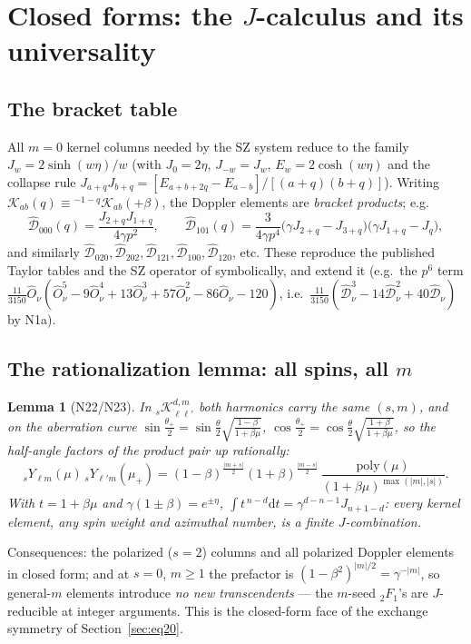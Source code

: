 \documentclass[useAMS,usenatbib]{article}
\newcommand{\Oh}{\hat{O}_\nu}
\newcommand{\Dv}{\hat{\mathcal{D}}_\nu}
\newcommand{\Kk}{\mathcal{K}}
\newcommand{\Do}{\hat{\mathcal{D}}}
\newcommand{\dd}{\mathrm{d}}
\newtheorem{lemma}{Lemma}
\begin{document}
\section{Closed forms: the $J$-calculus and its universality}\label{sec:closed}

\subsection{The bracket table}
All $m=0$ kernel columns needed by the SZ system reduce to the family $J_w = 2\sinh(w\eta)/w$ (with
$J_0 = 2\eta$, $J_{-w} = J_w$, $E_w = 2\cosh(w\eta)$ and the collapse rule
$J_{a+q}J_{b+q} = [E_{a+b+2q}-E_{a-b}]/[(a+q)(b+q)]$). Writing
$\Kk_{ab}(q) \equiv {}^{-1-q}\Kk_{ab}(+\beta)$, the Doppler elements are \emph{bracket products}; e.g.
\begin{equation}
  \Do_{000}(q) = \frac{J_{2+q}J_{1+q}}{4\gamma p^2},\qquad
  \Do_{101}(q) = \frac{3}{4\gamma p^4}\big(\gamma J_{2+q}-J_{3+q}\big)\big(\gamma J_{1+q}-J_{q}\big),
\end{equation}
and similarly $\Do_{020}, \Do_{202}, \Do_{121}, \Do_{100}, \Do_{120}$, etc. These reproduce the published
Taylor tables and the SZ operator of \citet[Eq.~11]{CR26} symbolically, and extend it (e.g.\ the $p^6$ term
$\tfrac{11}{3150}\Oh(\Oh^5-9\Oh^4+13\Oh^3+57\Oh^2-86\Oh-120)$, i.e.\
$\tfrac{11}{3150}(\Dv^3 - 14\Dv^2 + 40\Dv)$ by N1a).

\subsection{The rationalization lemma: all spins, all $m$}
\begin{lemma}[N22/N23]
In ${}_s\Kk^{d,m}_{\ell\ell'}$ both harmonics carry the same $(s,m)$, and on the aberration curve
$\sin\tfrac{\theta_+}{2} = \sin\tfrac\theta2\sqrt{\tfrac{1-\beta}{1+\beta\mu}}$,
$\cos\tfrac{\theta_+}{2} = \cos\tfrac\theta2\sqrt{\tfrac{1+\beta}{1+\beta\mu}}$, so the half-angle factors of the
product pair up rationally:
\begin{equation}
  {}_sY_{\ell m}(\mu)\,{}_sY_{\ell'm}(\mu_+)
  = (1-\beta)^{\frac{|m+s|}2}(1+\beta)^{\frac{|m-s|}2}\,
    \frac{\mathrm{poly}(\mu)}{(1+\beta\mu)^{\max(|m|,|s|)}}.
\end{equation}
With $t = 1+\beta\mu$ and $\gamma(1\pm\beta) = e^{\pm\eta}$, $\int t^{\,n-d}\dd t = \gamma^{d-n-1}J_{n+1-d}$:
\emph{every} kernel element, any spin weight and azimuthal number, is a finite $J$-combination.
\end{lemma}
Consequences: the polarized ($s=2$) columns and all polarized Doppler elements in closed form; and at $s=0$,
$m\ge1$ the prefactor is $(1-\beta^2)^{|m|/2} = \gamma^{-|m|}$, so general-$m$ elements introduce \emph{no new
transcendents} --- the $m$-seed ${}_2F_1$'s are $J$-reducible at integer arguments. This is the closed-form face
of the exchange symmetry of Section~\ref{sec:eq20}.
\end{document}
